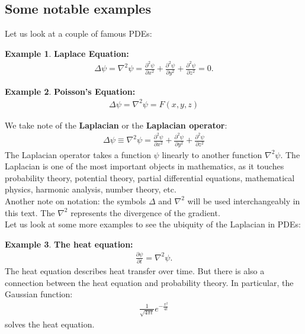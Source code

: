 \documentclass{article}
\theoremstyle{definition}
\newtheorem{exmp}{Example}[section]
\begin{document}
\subsection{Some notable examples}
Let us look at a couple of famous PDEs:
\begin{exmp}
	\textbf{Laplace Equation:}
	\begin{align*}
	\Delta \psi = \nabla^2\psi = \frac{\partial^2 \psi}{\partial x^2} + \frac{\partial^2 \psi}{\partial y^2} + \frac{\partial^2 \psi}{\partial z^2} = 0.
	\end{align*}
\end{exmp}

\begin{exmp}
	\textbf{Poisson's Equation:}
	\begin{align*}
	\Delta \psi = \nabla^2 \psi = F(x,y,z)
	\end{align*}
\end{exmp}

We take note of the \textbf{Laplacian} or the \textbf{Laplacian operator}:
\begin{align*}
\boxed{\Delta \psi \equiv \nabla^2 \psi = \frac{\partial^2 \psi}{\partial x^2} + \frac{\partial^2 \psi}{\partial y^2} + \frac{\partial^2 \psi}{\partial z^2}}
\end{align*}
The Laplacian operator takes a function $\psi$ linearly to another function $\nabla^2 \psi$. The Laplacian is one of the most important objects in mathematics, as it touches probability theory, potential theory, partial differential equations, mathematical physics, harmonic analysis, number theory, etc.\\

Another note on notation: the symbols $\Delta$ and $\nabla^2$ will be used interchangeably in this text. The $\nabla^2$ represents the divergence of the gradient.\\

Let us look at some more examples to see the ubiquity of the Laplacian in PDEs:
\begin{exmp}
	\textbf{The heat equation:}
	\begin{align*}
	\frac{\partial \psi}{\partial t} = \nabla^2 \psi.
	\end{align*}
	The heat equation describes heat transfer over time. But there is also a connection between the heat equation and probability theory. In particular, the Gaussian function:
	\begin{align*}
	\frac{1}{\sqrt{4\pi t}}e^{-\frac{x^2}{4t}}
	\end{align*}
	solves the heat equation.
\end{exmp}
\end{document}
